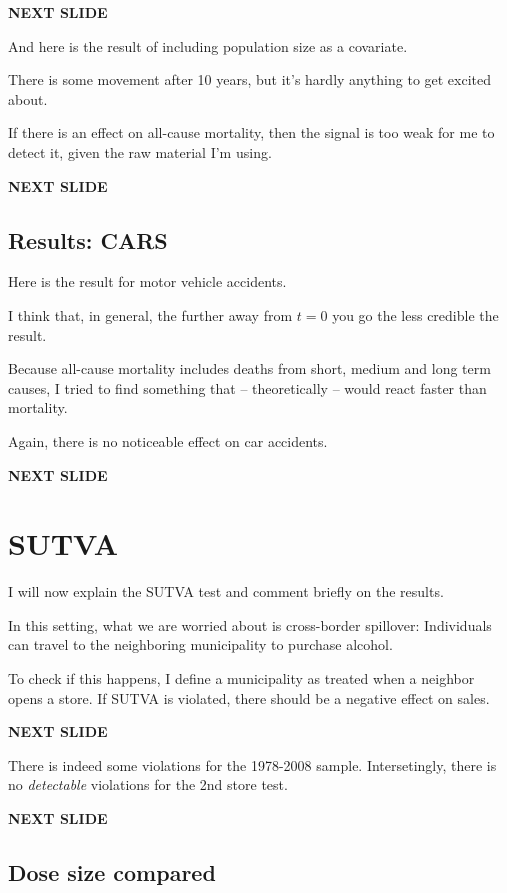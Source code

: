 \documentclass[12pt]{article}
\begin{document}
\textbf{NEXT SLIDE}

And here is the result of including population size as a covariate.

There is some movement after 10 years, but it's hardly anything to get excited about. 

If there is an effect on all-cause mortality, then the signal is too weak for me to detect it, given the raw material I'm using.

\textbf{NEXT SLIDE}

\subsection{Results: CARS}

Here is the result for motor vehicle accidents.

I think that, in general, the further away from $t = 0$ you go the less credible the result. 

Because all-cause mortality includes deaths from short, medium and long term causes, I tried to find something that -- theoretically -- would react faster than mortality. 

Again, there is no noticeable effect on car accidents.

\textbf{NEXT SLIDE}

\section{SUTVA}

I will now explain the SUTVA test and comment briefly on the results.

In this setting, what we are worried about is cross-border spillover: Individuals can travel to the neighboring municipality to purchase alcohol.

To check if this happens, I define a municipality as treated when a neighbor opens a store. If SUTVA is violated, there should be a negative effect on sales.

\textbf{NEXT SLIDE}

There is indeed some violations for the 1978-2008 sample. Intersetingly, there is no \emph{detectable} violations for the 2nd store test. 

\textbf{NEXT SLIDE}

\subsection{Dose size compared}
\end{document}
